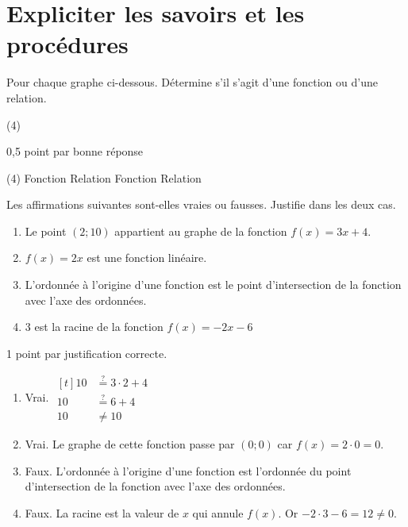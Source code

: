 \documentclass[a4paper, 12pt, parskip=half-]{scrartcl}
\begin{document}
\section*{ Expliciter les savoirs et les procédures}
\begin{exercise}[points=2]
    Pour chaque graphe ci-dessous. Détermine s'il s'agit d'une fonction ou d'une relation.
    \begin{tasks}(4)
        \task 
        \task 
        \task 
        \task 
    \end{tasks}
\end{exercise}
\begin{solution}
    0,5 point par bonne réponse
    \begin{tasks}(4)
        \task Fonction
        \task Relation
        \task Fonction
        \task Relation
    \end{tasks}
\end{solution}
\begin{exercise}[points=4]
    Les affirmations suivantes sont-elles vraies ou fausses. Justifie dans les deux cas.
    \begin{enumerate}
        \item Le point $(2;10)$ appartient au graphe de la fonction $f(x)=3x+4$.
        \item $f(x) = 2x$ est une fonction linéaire.
        \item L'ordonnée à l'origine d'une fonction est le point d'intersection de la fonction avec l'axe des ordonnées.
        \item $3$ est la racine de la fonction $f(x)=-2x-6$
    \end{enumerate}
\end{exercise}
\begin{solution}
    1 point par justification correcte.
    \begin{enumerate}
        \item Vrai.
              $\begin{aligned}[t]
                      10 & \stackrel{?}{=} 3\cdot 2 + 4 \\
                      10 & \stackrel{?}{=} 6 + 4        \\
                      10 & \ne 10
                  \end{aligned}$
        \item Vrai. Le graphe de cette fonction passe par $(0;0)$ car $f(x) = 2\cdot 0 = 0$.
        \item Faux. L'ordonnée à l'origine d'une fonction est l'ordonnée du point d'intersection de la fonction avec l'axe des ordonnées.
        \item Faux. La racine est la valeur de $x$ qui annule $f(x)$. Or $-2\cdot 3 - 6 = 12 \ne 0$.
    \end{enumerate}
\end{solution}
\end{document}
